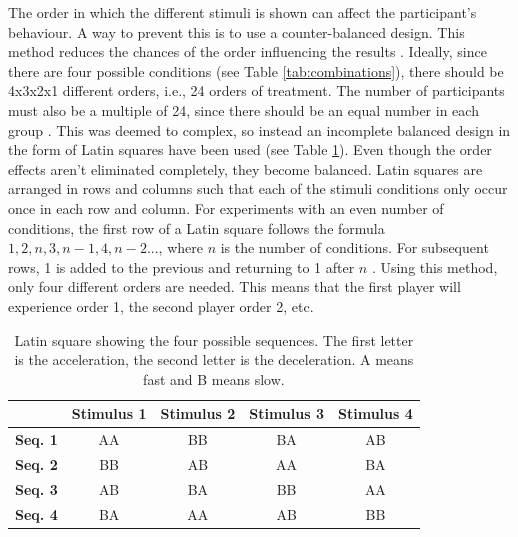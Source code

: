 The order in which the different stimuli is shown can affect the participant's behaviour.  A way to prevent this is to use a counter-balanced design. This method reduces the chances of the order influencing the results \cite{experimental2}. Ideally, since there are four possible conditions (see Table \ref{tab:combinations}), there should be 4x3x2x1 different orders, i.e., 24 orders of treatment. The number of participants must also be a multiple of 24, since there should be an equal number in each group \cite{experimental2}. This was deemed to complex, so instead an incomplete balanced design in the form of Latin squares have been used (see Table \ref{table:latin}). Even though the order effects aren't eliminated completely, they become balanced. Latin squares are arranged in rows and columns such that each of the stimuli conditions only occur once in each row and column. For experiments with an even number of conditions, the first row of a Latin square follows the formula $1, 2, n, 3, n-1, 4, n-2...$, where $n$ is the number of conditions. For subsequent rows, 1 is added to the previous and returning to 1 after $n$ \cite{experimental2}. Using this method, only four different orders are needed. This means that the first player will experience order 1, the second player order 2, etc.

\begin{table}[htbp]
\scriptsize
\centering
\begin{tabular}{|c|c|c|c|c|}
\hline
 & \textbf{Stimulus 1} & \textbf{Stimulus 2} & \textbf{Stimulus 3} & \textbf{Stimulus 4}\\
 \hline
\textbf{Seq. 1} & AA & BB & BA & AB\\
\hline
\textbf{Seq. 2} & BB & AB & AA & BA\\
\hline
\textbf{Seq. 3} & AB & BA & BB & AA\\
\hline
\textbf{Seq. 4} & BA & AA & AB & BB\\
\hline
\end{tabular}
\caption{Latin square showing the four possible sequences. The first letter is the acceleration, the second letter is the deceleration. A means fast and B means slow.}
\label{table:latin}
\end{table}



